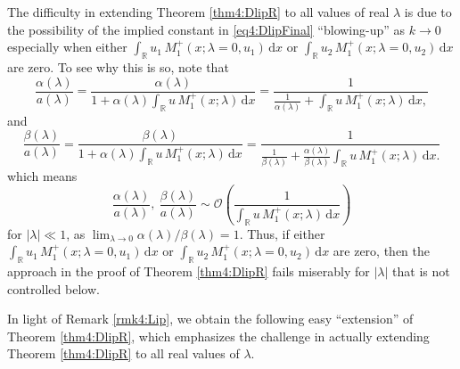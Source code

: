 \documentclass[../dissertation.tex]{subfiles}
\begin{document}
\begin{rmk}\label{rmk4:Lip}
	The difficulty in extending Theorem \ref{thm4:DlipR} to all values of real 
	$\lambda$ is due to the possibility of the implied constant in 
	\eqref{eq4:DlipFinal} ``blowing-up'' as $k\to 0$\textemdash{}especially when 
	either $\int_{\mathbb R} u_1 \, M_1^+(x; \lambda = 0, u_1) \, \mathrm{d}x$ or 
	$\int_{\mathbb R} u_2 \, M_1^+(x; \lambda = 0, u_2) \, \mathrm{d}x$ are zero. To see 
	why this is so, note that 
	\[
		\frac{\alpha(\lambda)}{a(\lambda)}
			= \frac{\alpha(\lambda)}
				{
					1 
						+ \alpha(\lambda) 
							\int_{\mathbb R} 
								u \, M_1^+(x; \lambda) 
							\, \mathrm{d}x
				}
			=\frac{1}
				{
					\frac{1}{\alpha(\lambda)} 
						+ \int_{\mathbb R} u \, M_1^+(x; \lambda) \, \mathrm{d}x,
				}
	\]
	and
	\[
		\frac{\beta(\lambda)}{a(\lambda)}
			= \frac{\beta(\lambda)}
				{
					1 
						+ \alpha(\lambda) 
							\int_{\mathbb R} 
								u \, M_1^+(x; \lambda) 
							\, \mathrm{d}x
				}
			=\frac{1}
				{
					\frac{1}{\beta(\lambda)} 
						+ \frac{\alpha(\lambda)}{\beta(\lambda)}
							\int_{\mathbb R} 
								u \, M_1^+(x; \lambda) 
							\, \mathrm{d}x.
				}
	\]
	which means 
	\[
		\frac{\alpha(\lambda)}{a(\lambda)},~\frac{\beta(\lambda)}{a(\lambda)}
			\sim \mathcal O
				\left(
					\frac{1}
						{
							\int_{\mathbb R} 
								u \, M_1^+(x; \lambda) 
							\, \mathrm{d}x
						}
				\right)
	\]
	for $|\lambda| \ll 1$, as 
	$\lim_{\lambda\to0} \alpha(\lambda) / \beta(\lambda) = 1$.
	Thus, if either $\int_{\mathbb R} u_1 \, M_1^+(x; \lambda = 0, u_1) \, \mathrm{d}x$ or 
	$\int_{\mathbb R} u_2 \, M_1^+(x; \lambda = 0, u_2) \, \mathrm{d}x$ are zero, then the 
	approach in the proof of Theorem \ref{thm4:DlipR} fails miserably for 
	$|\lambda|$ that is not controlled below.
\end{rmk}

In light of Remark \ref{rmk4:Lip}, we obtain the following easy ``extension''
of Theorem \ref{thm4:DlipR}, which emphasizes the challenge in actually extending
Theorem \ref{thm4:DlipR} to all real values of $\lambda$. 
\end{document}
